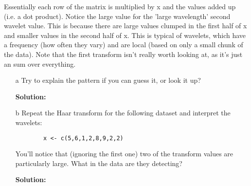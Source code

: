 \documentclass[12pt]{article}
\makeatletter
\theoremstyle{homework}
\newenvironment{exercise}[1]
{\def\@currentlabel{#1}\exercisecore}
{\endexercisecore}
\newcommand{\localhead}[1]{\par\smallskip\noindent\textbf{#1}\nobreak\\}%
\newcommand\solution{\localhead{Solution:}}
\makeatother
\begin{document}
\begin{exercise}{1}
Essentially each row of the matrix is multiplied by x and the values added up (i.e. a dot product). Notice the large value for the 'large wavelength'
second wavelet value. This is because there are large values clumped in the first half of x and smaller values in the second half of x. This is typical
of wavelets, which have a frequency (how often they vary) and are local (based on only a small chunk of the data). Note that the first transform
isn't really worth looking at, as it's just an sum over everything.\\
\begin{enumerate}
  \item[a] Try to explain the pattern if you can guess it, or look it up?\\
  \solution 
  \vspace{.15in}




  \item[b] Repeat the Haar transform for the following dataset and interpret the wavelets:
\begin{footnotesize}
\begin{verbatim}
        x <- c(5,6,1,2,8,9,2,2) 
\end{verbatim}
\end{footnotesize}
You’ll notice that (ignoring the first one) two of the transform values are particularly large. What in the data are they detecting?\\
    \solution 

\end{enumerate}







\end{exercise}
\end{document}
